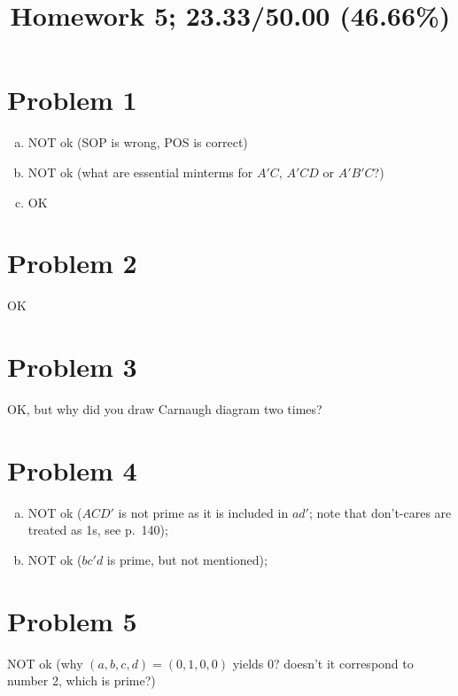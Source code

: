 \documentclass[10pt]{article} %
\title{Homework 5;
23.33/50.00 (46.66\%)
}
\begin{document}
\maketitle

\section*{Problem 1 }
\begin{enumerate}[(a)]
	\item NOT ok (SOP is wrong, POS is correct)
	\item NOT ok (what are essential minterms for $A'C$, $A'CD$ or $A'B'C$?)
	\item OK
\end{enumerate}
\section*{Problem 2 }
OK
\section*{Problem 3 }
OK, but why did you draw Carnaugh diagram two times?
\section*{Problem 4 }
\begin{enumerate}[(a)]
	\item NOT ok ($ACD'$ is not prime as it is included in $ad'$; note that don't-cares are
		treated as 1s, see p.~140);
	\item NOT ok ($b c'd$ is prime, but not mentioned);
\end{enumerate}
\section*{Problem 5 }
NOT ok (why $(a,b,c,d)=(0,1,0,0)$ yields 0? doesn't it correspond to number 2, which is prime?)
\end{document}
